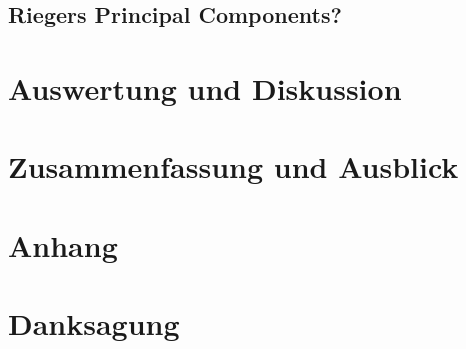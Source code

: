 \documentclass[12pt,a4paper,onecolumn]{scrartcl}
\begin{document}
\subsection{Riegers Principal Components?}

\section{Auswertung und Diskussion}
\section{Zusammenfassung und Ausblick}
\newpage
\printbibliography
\newpage
\appendix
\section{Anhang}
\listoffigures
{}
\listoftables
\section{Danksagung}
\end{document}
